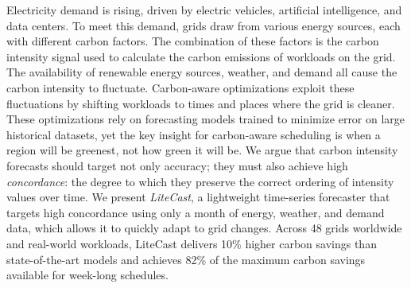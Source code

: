 Electricity demand is rising, driven by electric vehicles, artificial intelligence, and data centers.
To meet this demand, grids draw from various energy sources, each with different carbon factors. 
The combination of these factors is the carbon intensity signal used to calculate the carbon emissions of workloads on the grid. 
The availability of renewable energy sources, weather, and demand all cause the carbon intensity to fluctuate.
Carbon-aware optimizations exploit these fluctuations by shifting workloads to times and places where the grid is cleaner.
These optimizations rely on forecasting models trained to minimize error on large historical datasets, yet the key insight for carbon-aware scheduling is when a region will be greenest, not how green it will be.
We argue that carbon intensity forecasts should target not only accuracy; they must also achieve high \textit{concordance}: the degree to which they preserve the correct ordering of intensity values over time.
We present \textit{LiteCast}, a lightweight time-series forecaster that targets high concordance using only a month of energy, weather, and demand data, which allows it to quickly adapt to grid changes.
Across 48 grids worldwide and real-world workloads, LiteCast delivers 10\% higher carbon savings than state-of-the-art models and achieves 82\% of the maximum carbon savings available for week-long schedules.
